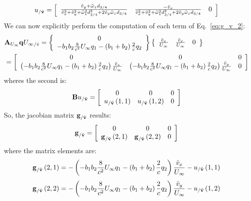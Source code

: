 \begin{equation}
	u_{/\tilde{\bm{\mathbf{v}}}} = \left[
	\begin{array}{ccc}
	\frac{\tilde{v}_y + \tilde{\omega}_z d_{3/4}}{\tilde{v}_x^2 + \tilde{v}_y^2 + 
		\tilde{\omega}_z^2 d_{3/4}^2 + 2 \tilde{v}_y \tilde{\omega}_z d_{3/4}} &
	\frac{-\tilde{v}_x}{\tilde{v}_x^2 + \tilde{v}_y^2 + 
		\tilde{\omega}_z^2 d_{3/4}^2 + 2 \tilde{v}_y \tilde{\omega}_z d_{3/4}} &
	0
	\end{array}
	\right]
\end{equation}
We can now explicitly perform the computation of each term of Eq.~\ref{eq:g_v_2}:
\begin{align}
&\bm{\mathbf{A}}_{U_\infty} \bm{\mathbf{q}}  {U_\infty}_{/\tilde{v}}
	= \left\{
		\begin{array}{c}
			0 \\
			-b_1 b_2 \frac{8}{c^2} U_\infty q_1 - \left( b_1+b_2 \right) \frac{2}{c} q_2 \\
		\end{array}\right\}
		\left\{
		\begin{array}{ccc}
			\frac{\tilde{v}_x}{U_\infty} &
			\frac{\tilde{v}_x}{U_\infty} &
			0
		\end{array}\right\} \\
	&= \left[
		\begin{array}{ccc}
			0 & 0 & 0\\
			\left( -b_1 b_2 \frac{8}{c^2} U_\infty q_1 - \left( b_1+b_2 \right) \frac{2}{c} q_2 \right) \frac{\tilde{v}_x}{U_\infty} &
			\left( -b_1 b_2 \frac{8}{c^2} U_\infty q_1 - \left( b_1+b_2 \right) \frac{2}{c} q_2 \right) \frac{\tilde{v}_y}{U_\infty} & 0\\
		\end{array} \right]
\end{align}
wheres the second is:
\begin{equation}
\bm{\mathbf{B}} u_{/\tilde{\bm{\mathbf{v}}}} = \left[
	\begin{array}{ccc}
		0 & 0 & 0 \\
		u_{/\tilde{\bm{\mathbf{v}}}}\left( 1,1 \right) &
		u_{/\tilde{\bm{\mathbf{v}}}}\left( 1,2 \right) & 0 \\
	\end{array} \right]
\end{equation}
So, the jacobian matrix $\bm{\mathbf{g}}_{/\tilde{\bm{\mathbf{v}}}}$ results:
\begin{equation}
\bm{\mathbf{g}}_{/\tilde{\bm{\mathbf{v}}}} = \left[
	\begin{array}{ccc}
		0 & 0 & 0 \\
		\bm{\mathbf{g}}_{/\tilde{\bm{\mathbf{v}}}}\left( 2,1 \right) &
		\bm{\mathbf{g}}_{/\tilde{\bm{\mathbf{v}}}}\left( 2,2 \right) & 0 \\
	\end{array} \right]
\end{equation}
where the matrix elements are:
\begin{equation}
\bm{\mathbf{g}}_{/\tilde{\bm{\mathbf{v}}}}\left( 2,1 \right)  = 
-\left( -b_1 b_2 \frac{8}{c^2} U_\infty q_1 - \left( b_1+b_2 \right) \frac{2}{c} q_2 \right) \frac{\tilde{v}_x}{U_\infty} 
-u_{/\tilde{\bm{\mathbf{v}}}}\left( 1,1 \right)
\end{equation}
\begin{equation}
\bm{\mathbf{g}}_{/\tilde{\bm{\mathbf{v}}}}\left( 2,2 \right)  = 
-\left( -b_1 b_2 \frac{8}{c^2} U_\infty q_1 - \left( b_1+b_2 \right) \frac{2}{c} q_2 \right) \frac{\tilde{v}_y}{U_\infty} 
-u_{/\tilde{\bm{\mathbf{v}}}}\left( 1,2 \right)
\end{equation}


